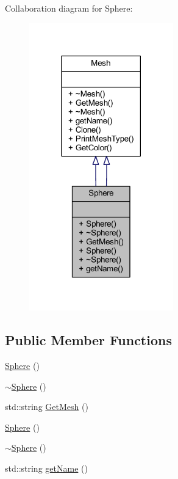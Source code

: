 Collaboration diagram for Sphere\+:
\nopagebreak
\begin{figure}[H]
\begin{center}
\leavevmode
\includegraphics[width=177pt]{class_sphere__coll__graph}
\end{center}
\end{figure}
\subsection*{Public Member Functions}
\begin{DoxyCompactItemize}
\item 
\mbox{\hyperlink{class_sphere_a890a63ff583cb88e7ec4e840b4ef5eb9}{Sphere}} ()
\item 
\mbox{\hyperlink{class_sphere_a569c071e50a3e11f678630ee1a17737e}{$\sim$\+Sphere}} ()
\item 
std\+::string \mbox{\hyperlink{class_sphere_afd7c86e5319c93163781df0e44cbfd49}{Get\+Mesh}} ()
\item 
\mbox{\hyperlink{class_sphere_a890a63ff583cb88e7ec4e840b4ef5eb9}{Sphere}} ()
\item 
\mbox{\hyperlink{class_sphere_a569c071e50a3e11f678630ee1a17737e}{$\sim$\+Sphere}} ()
\item 
std\+::string \mbox{\hyperlink{class_sphere_a173e667086ecd8b9d972e1d6f9885d9d}{get\+Name}} ()
\end{DoxyCompactItemize}


